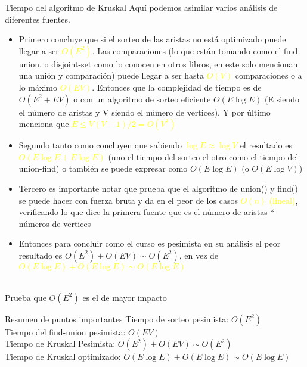 \begin{frame}[allowframebreaks]{Tiempo del algoritmo de Kruskal}
Aquí podemos asimilar varios análisis de diferentes fuentes. 
\begin{itemize}
    \item Primero \cite{Albertson_Hutchinson_1988} concluye que si el sorteo de las aristas no está optimizado puede llegar a ser \textcolor{yellow}{$O(E^2)$}. Las comparaciones (lo que están tomando como el find-union, o disjoint-set como lo conocen en otros libros, en este solo mencionan una unión y comparación) puede llegar a ser hasta \textcolor{yellow}{$O(V)$} comparaciones o a lo máximo \textcolor{yellow}{$O(EV)$}. Entonces que la complejidad de tiempo es de \textcolor{orange2}{$O(E^2 + EV)$} o con un algoritmo de sorteo eficiente \textcolor{orange2}{$O(E \log E)$} (E siendo el número de aristas y V siendo el número de vertices). Y por último menciona que \textcolor{yellow}{$E \leq V(V-1)/2 = O(V^2)$}
    \item Segundo tanto \cite{geeksforgeeksKruskal} como \cite{Dasgupta_Papadimitriou_Vazirani_2006} concluyen que sabiendo \textcolor{yellow}{$\log E \approx \log V$} el resultado es \textcolor{yellow}{$O(E\log E + E\log E)$} (uno el tiempo del sorteo el otro como el tiempo del union-find) o también se puede expresar como \textcolor{orange2}{$O(E\log E)$} (o \textcolor{orange2}{$O(E\log V)$})
    \item Tercero es importante notar que \cite{geeksforgeeksUnionFind} prueba que el algoritmo de union() y find() se puede hacer con fuerza bruta y da en el peor de los casos \textcolor{yellow}{$O(n)$ (lineal)}, verificando lo que dice la primera fuente que es el número de aristas * números de vertices
    \item Entonces para concluir como el curso es pesimista en su análisis el peor resultado es \textcolor{orange2}{$O(E^2) + O(EV) \sim O(E^2)$}, en vez de \textcolor{yellow}{$O(E\log E) + O(E\log E) \sim O(E \log E)$}
\end{itemize} \newpage

\centering
{} \\
Prueba que $O(E^2)$ es el de mayor impacto \newpage

\begin{block}{Resumen de puntos importantes}
    Tiempo de sorteo pesimista: $O(E^2)$ \\
    Tiempo del find-union pesimista: $O(EV)$ \\
    Tiempo de Kruskal Pesimista: $O(E^2) + O(EV) \sim O(E^2)$ \\
    Tiempo de Kruskal optimizado: $O(E\log E) + O(E\log E) \sim O(E \log E)$
\end{block}
\end{frame}